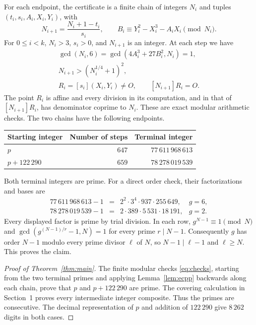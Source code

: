 \documentclass[11pt]{amsart}
\theoremstyle{definition}
\begin{document}
For each endpoint, the certificate is a finite chain of integers $N_i$ and
tuples $(t_i,s_i,A_i,X_i,Y_i)$, with
\[
 N_{i+1}=\frac{N_i+1-t_i}{s_i},\qquad
 B_i\equiv Y_i^2-X_i^3-A_iX_i\pmod{N_i}.
\]
For $0\le i<k$, $N_i>3$, $s_i>0$, and $N_{i+1}$ is an integer.
At each step we have
\begin{equation}\label{eq:checks}
\begin{gathered}
 \gcd(N_i,6)=\gcd(4A_i^3+27B_i^2,N_i)=1,\\
 N_{i+1}>(N_i^{1/4}+1)^2,\\
 R_i=[s_i](X_i,Y_i)\ne O,\qquad [N_{i+1}]R_i=O.
\end{gathered}
\end{equation}
The point $R_i$ is affine and every division in its computation, and in that
of $[N_{i+1}]R_i$, has denominator coprime to $N_i$. These are exact modular
arithmetic checks. The two chains have the following endpoints.
\begin{center}
\begin{tabular}{l r r}
\toprule
Starting integer & Number of steps & Terminal integer\\
\midrule
$p$ & $647$ & $77\,611\,968\,613$\\
$p+122\,290$ & $659$ & $78\,278\,019\,539$\\
\bottomrule
\end{tabular}
\end{center}
Both terminal integers are prime. For a direct order check, their
factorizations and bases are
\[
\begin{array}{rcll}
77\,611\,968\,613-1&=&2^2\cdot3^4\cdot937\cdot255\,649,&g=6,\\
78\,278\,019\,539-1&=&2\cdot389\cdot5\,531\cdot18\,191,&g=2.
\end{array}
\]
Every displayed factor is prime by trial division. In each row,
$g^{N-1}\equiv1\pmod N$ and
$\gcd(g^{(N-1)/r}-1,N)=1$ for every prime $r\mid N-1$.
Consequently $g$ has order $N-1$ modulo every prime divisor $\ell$ of $N$,
so $N-1\mid\ell-1$ and $\ell\ge N$. This proves the claim.

\begin{proof}[Proof of Theorem~\ref{thm:main}]
The finite modular checks \eqref{eq:checks}, starting from the two terminal
primes and applying Lemma~\ref{lem:ecpp} backwards along each chain, prove
that $p$ and $p+122\,290$ are prime. The covering calculation in Section~1
proves every intermediate integer composite. Thus the primes are consecutive.
The decimal representation of $p$ and addition of $122\,290$ give $8\,262$
digits in both cases.
\end{proof}
\end{document}
